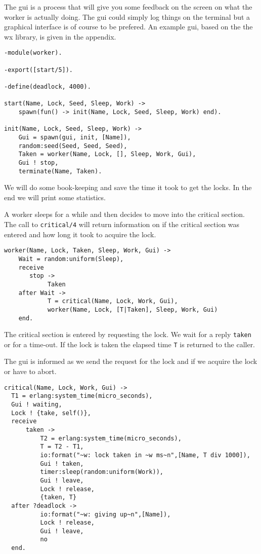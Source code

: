 \documentclass[a4paper, 11pt]{article}
\begin{document}
The gui is a process that will give you some feedback on the screen on
what the worker is actually doing. The gui could simply log things on
the terminal but a graphical interface is of course to be
prefered. An example gui, based on the the wx library, is given in the appendix.


\begin{verbatim}
-module(worker).

-export([start/5]).

-define(deadlock, 4000).

start(Name, Lock, Seed, Sleep, Work) ->
    spawn(fun() -> init(Name, Lock, Seed, Sleep, Work) end).

init(Name, Lock, Seed, Sleep, Work) ->
    Gui = spawn(gui, init, [Name]),
    random:seed(Seed, Seed, Seed),
    Taken = worker(Name, Lock, [], Sleep, Work, Gui),
    Gui ! stop,
    terminate(Name, Taken).
\end{verbatim}

We will do some book-keeping and save the time it took to get the
locks. In the end we will print some statistics.

A worker sleeps for a while and then decides to move into the critical
section. The call to {\tt critical/4} will return information on if
the critical section was entered and how long it took to acquire the
lock.

\begin{verbatim}
worker(Name, Lock, Taken, Sleep, Work, Gui) ->
    Wait = random:uniform(Sleep),
    receive 
       stop ->
            Taken
    after Wait ->
            T = critical(Name, Lock, Work, Gui),
            worker(Name, Lock, [T|Taken], Sleep, Work, Gui)
    end.
\end{verbatim}

The critical section is entered by requesting the lock. We wait for a
reply {\tt taken} or for a time-out. If the lock is taken the elapsed
time {\tt T} is returned to the caller.

The gui is informed as we send the request for the lock and if we
acquire the lock or have to abort.

\begin{verbatim}
critical(Name, Lock, Work, Gui) ->
  T1 = erlang:system_time(micro_seconds),
  Gui ! waiting,
  Lock ! {take, self()},
  receive
      taken ->
          T2 = erlang:system_time(micro_seconds),
          T = T2 - T1,
          io:format("~w: lock taken in ~w ms~n",[Name, T div 1000]),
          Gui ! taken,
          timer:sleep(random:uniform(Work)),
          Gui ! leave,
          Lock ! release,
          {taken, T}
  after ?deadlock ->
          io:format("~w: giving up~n",[Name]),
          Lock ! release,
          Gui ! leave,
          no
  end.
\end{verbatim}
\end{document}
